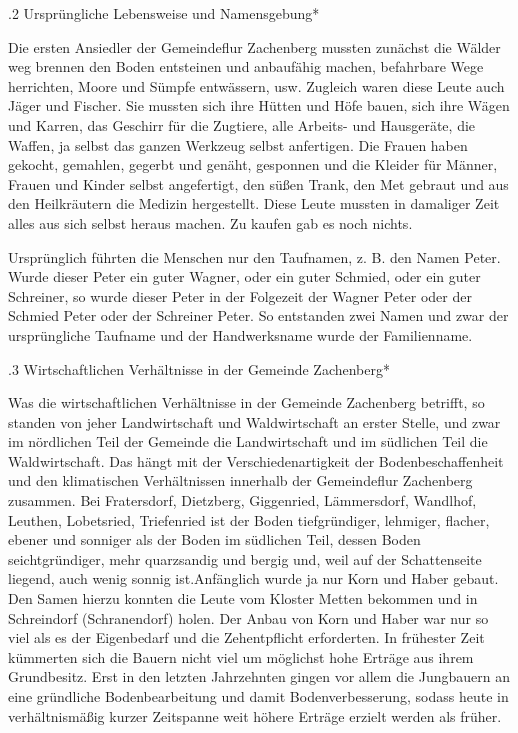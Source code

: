 .2 Ursprüngliche Lebensweise und Namensgebung*

Die ersten Ansiedler der Gemeindeflur Zachenberg mussten zunächst die Wälder weg
brennen den Boden entsteinen und anbaufähig machen, befahrbare Wege herrichten,
Moore und Sümpfe entwässern, usw. Zugleich waren diese Leute auch Jäger und
Fischer. Sie mussten sich ihre Hütten und Höfe bauen, sich ihre Wägen und
Karren, das Geschirr für die Zugtiere, alle Arbeits- und Hausgeräte, die Waffen,
ja selbst das ganzen Werkzeug selbst anfertigen. Die Frauen haben gekocht,
gemahlen, gegerbt und genäht, gesponnen und die Kleider für Männer, Frauen und
Kinder selbst angefertigt, den süßen Trank, den Met gebraut und aus den
Heilkräutern die Medizin hergestellt. Diese Leute mussten in damaliger Zeit
alles aus sich selbst heraus machen. Zu kaufen gab es noch nichts.

Ursprünglich führten die Menschen nur den Taufnamen, z. B. den Namen Peter.
Wurde dieser Peter ein guter Wagner, oder ein guter Schmied, oder ein guter
Schreiner, so wurde dieser Peter in der Folgezeit der Wagner Peter oder der
Schmied Peter oder der Schreiner Peter. So entstanden zwei Namen und zwar der
ursprüngliche Taufname und der Handwerksname wurde der Familienname.

.3 Wirtschaftlichen Verhältnisse in der Gemeinde Zachenberg*

Was die wirtschaftlichen Verhältnisse in der Gemeinde Zachenberg betrifft, so
standen von jeher Landwirtschaft und Waldwirtschaft an erster Stelle, und zwar
im nördlichen Teil der Gemeinde die Landwirtschaft und im südlichen Teil die
Waldwirtschaft. Das hängt mit der Verschiedenartigkeit der Bodenbeschaffenheit
und den klimatischen Verhältnissen innerhalb der Gemeindeflur Zachenberg
zusammen. Bei Fratersdorf, Dietzberg, Giggenried, Lämmersdorf, Wandlhof,
Leuthen, Lobetsried, Triefenried ist der Boden tiefgründiger, lehmiger, flacher,
ebener und sonniger als der Boden im südlichen Teil, dessen Boden
seichtgründiger, mehr quarzsandig und bergig und, weil auf der Schattenseite
liegend, auch wenig sonnig ist.Anfänglich wurde ja nur Korn und Haber gebaut.
Den Samen hierzu konnten die Leute vom Kloster Metten bekommen und in
Schreindorf (Schranendorf) holen. Der Anbau von Korn und Haber war nur so viel
als es der Eigenbedarf und die Zehentpflicht erforderten. In frühester Zeit
kümmerten sich die Bauern nicht viel um möglichst hohe Erträge aus ihrem
Grundbesitz. Erst in den letzten Jahrzehnten gingen vor allem die Jungbauern an
eine gründliche Bodenbearbeitung und damit Bodenverbesserung, sodass heute in
verhältnismäßig kurzer Zeitspanne weit höhere Erträge erzielt werden als früher.

